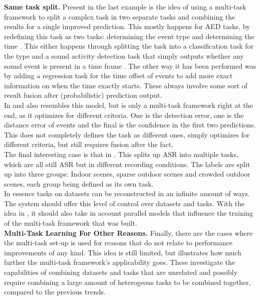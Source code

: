 \textbf{Same task split.} Present in the last example \cite{huang2020guided} is the idea of using a multi-task framework to split a complex task in two separate tasks and combining the results for a single improved prediction. This mostly happens for AED tasks, by redefining this task as two tasks: determining the event type and determining the time . This either happens through splitting the task into a classification task for the type and a sound activity detection task that simply outputs whether any sound event is present in a time frame \citep{morfi2018deep} \citep{pankajakshan2019polyphonic}. The other way it has been performed was by adding a regression task for the time offset of events to add more exact information on when the time exactly starts. These always involve some sort of result fusion after (probabilistic) prediction output. \\

In \cite{phan2017dnn} and \cite{phan2019unifying} also resembles this model, but is only a multi-task framework right at the end, as it optimizes for different criteria. One is the detection error, one is the distance error of events and the final is the confidence in the first two predictions. This does not completely defines the task as different ones, simply optimizes for different criteria, but still requires fusion after the fact. \\

The final interesting case is that in \cite{nwe2017convolutional}. This splits up ASR into multiple tasks, which are all still ASR but in different recording conditions. The labels are split up into three groups: Indoor scenes, sparse outdoor scenes and crowded outdoor scenes, each group being defined as its own task. \\

In essence tasks on datasets can be reconstructed in an infinite amount of ways. The system should offer this level of control over datasets and tasks. With the idea in \cite{huang2020guided}, it should also take in account parallel models that influence the training of the multi-task framework that was built.\\


\textbf{Multi-Task Learning For Other Reasons.} Finally, there are the cases where the multi-task set-up is used for reasons that do not relate to performance improvements of any kind. This idea is still limited, but illustrates how much further the multi-task framework's applicability goes. These investigate the capabilities of combining datasets and tasks that are unrelated and possibly require combining a large amount of heterogeous tasks to be combined together, compared to the previous trends.\\

